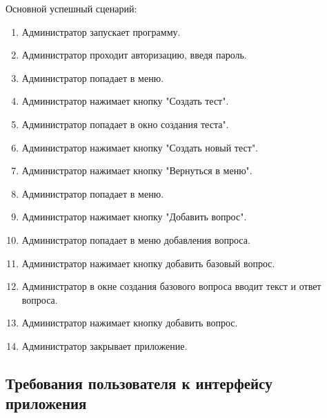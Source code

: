 Основной успешный сценарий:
\begin{enumerate}
	\item Администратор запускает программу.
	\item Администратор проходит авторизацию, введя пароль.
	\item Администратор попадает в меню.
	\item Администратор нажимает кнопку "Создать тест".
	\item Администратор попадает в окно создания теста".
	\item Администратор нажимает кнопку "Создать новый тест".
	\item Администратор нажимает кнопку "Вернуться в меню".
	\item Администратор попадает в меню.
	\item Администратор нажимает кнопку "Добавить вопрос".
	\item Администратор попадает в меню добавления вопроса.
	\item Администратор нажимает кнопку добавить базовый вопрос.
	\item Администратор в окне создания базового вопроса вводит текст и ответ вопроса.
	\item Администратор нажимает кнопку добавить вопрос.
	\item Администратор закрывает приложение.
\end{enumerate}

\subsection{Требования пользователя к интерфейсу приложения}

